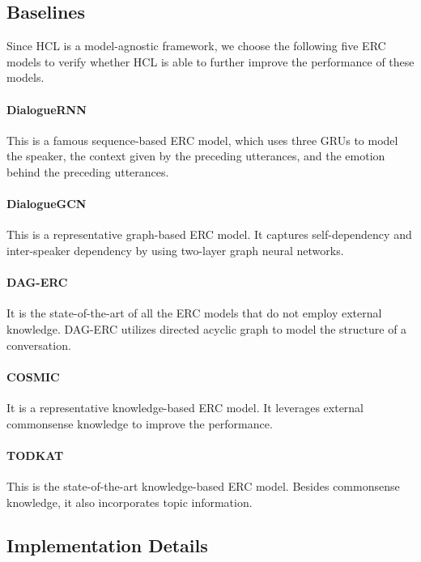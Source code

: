 \documentclass[letterpaper]{article} \usepackage{aaai22}  \usepackage{times}  \usepackage{helvet}  \usepackage{courier}  \usepackage[hyphens]{url}  \usepackage{graphicx} \urlstyle{rm} \def\UrlFont{\rm}  \usepackage{natbib}  \usepackage{caption} \DeclareCaptionStyle{ruled}{labelfont=normalfont,labelsep=colon,strut=off} \frenchspacing  \setlength{\pdfpagewidth}{8.5in}  \setlength{\pdfpageheight}{11in}
\begin{document}
\subsection{Baselines}

Since HCL is a model-agnostic framework, we choose the following five ERC models to verify whether HCL is able to further improve the performance of these models.



\paragraph{DialogueRNN}\cite{majumder2019dialoguernn}  This is a famous sequence-based ERC model, which uses three GRUs to model the speaker, the context given by the preceding utterances, and the emotion behind the preceding utterances. 

\paragraph{DialogueGCN} \cite{ghosal2019dialoguegcn} This is a representative graph-based ERC model. It captures self-dependency and inter-speaker dependency by using two-layer graph neural networks.

\paragraph{DAG-ERC} \cite{shen2021directed} It is the state-of-the-art of all the ERC models that do not employ external knowledge. DAG-ERC utilizes directed acyclic graph to model the structure of a conversation.

\paragraph{COSMIC} \cite{ghosal2020cosmic} It is a representative knowledge-based ERC model. It leverages external commonsense knowledge to improve the performance.

\paragraph{TODKAT} \cite{zhu2021topic} This is the state-of-the-art  knowledge-based ERC model. Besides commonsense knowledge, it also incorporates topic information.



\subsection{Implementation Details}
\end{document}
